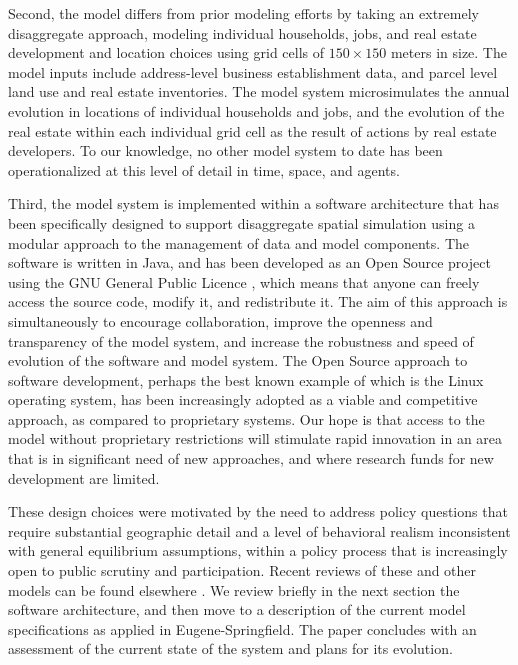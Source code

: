 \documentclass[fleqn]{article}
\begin{document}
Second, the model differs from prior modeling efforts by taking an
extremely disaggregate approach, modeling individual households,
jobs, and real estate development and location choices using grid
cells of $150 \times 150$ meters in size.  The model inputs include
address-level business establishment data, and parcel level land
use and real estate inventories.  The model system microsimulates
the annual evolution in locations of individual households and
jobs, and the evolution of the real estate within each individual
grid cell as the result of actions by real estate developers.  To
our knowledge, no other model system to date has been
operationalized at this level of detail in time, space, and agents.

Third, the model system is implemented within a software
architecture that has been specifically designed to support
disaggregate spatial simulation using a modular approach to the
management of data and model components.  The software is written
in Java, and has been developed as an Open Source project using
the GNU General Public Licence \cite{gpl-web},
which means that anyone can freely
access the source code, modify it, and redistribute it.  The aim
of this approach is simultaneously to encourage collaboration,
improve the openness and transparency of the model system, and
increase the robustness and speed of evolution of the software and
model system.  The Open Source approach to software development,
perhaps the best known example of which is
the Linux operating system, has been increasingly
adopted as a viable and competitive approach, as compared to
proprietary systems.  Our hope is that access to the model without
proprietary restrictions will stimulate rapid innovation in an
area that is in significant need of new approaches, and where
research funds for new development are limited.

These design choices were motivated by the need to address policy
questions that require substantial geographic detail and a level
of behavioral realism inconsistent with general equilibrium
assumptions, within a policy process that is increasingly open to
public scrutiny and participation. Recent reviews of these and
other models can be found elsewhere
\cite{dowling-nchrp-2000,epa-report-2000,miller-tcrp-1999}.  We
review briefly in the next section the software architecture, and
then move to a description of the current model specifications as
applied in Eugene-Springfield. The paper concludes with an
assessment of the current state of the system and plans for its
evolution.
\end{document}
